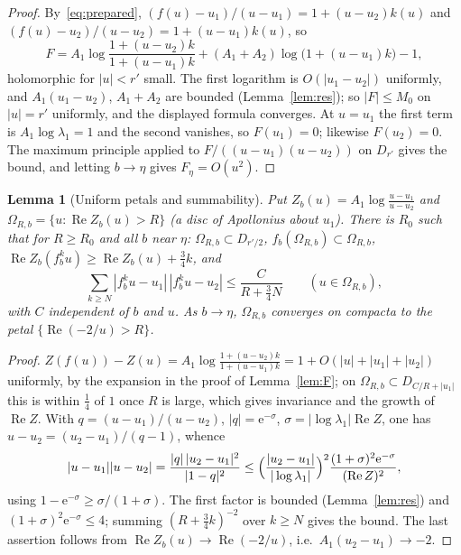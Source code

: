 \documentclass[11pt,a4paper]{article}
\newtheorem{lemma}[theorem]{Lemma}
\theoremstyle{definition}
\newcommand{\eee}{\mathrm{e}}
\begin{document}
\begin{proof}
By~\eqref{eq:prepared}, $(f(u)-u_1)/(u-u_1)=1+(u-u_2)k(u)$ and
$(f(u)-u_2)/(u-u_2)=1+(u-u_1)k(u)$, so
\[
 F=A_1\log\frac{1+(u-u_2)k}{1+(u-u_1)k}+(A_1+A_2)\log\bigl(1+(u-u_1)k\bigr)-1,
\]
holomorphic for $|u|<r'$ small.  The first logarithm is $O(|u_1-u_2|)$
uniformly, and $A_1(u_1-u_2)$, $A_1+A_2$ are bounded (Lemma~\ref{lem:res}); so
$|F|\le M_0$ on $|u|=r'$ uniformly, and the displayed formula converges.  At
$u=u_1$ the first term is $A_1\log\lambda_1=1$ and the second vanishes, so
$F(u_1)=0$; likewise $F(u_2)=0$.  The maximum principle applied to
$F/((u-u_1)(u-u_2))$ on $D_{r'}$ gives the bound, and letting $b\to\eta$ gives
$F_\eta=O(u^2)$.
\end{proof}

\begin{lemma}[Uniform petals and summability]\label{lem:petal}
Put $Z_b(u)=A_1\log\frac{u-u_1}{u-u_2}$ and
$\Omega_{R,b}=\{u:\operatorname{Re}Z_b(u)>R\}$ (a disc of Apollonius about
$u_1$).  There is $R_0$ such that for $R\ge R_0$ and all $b$ near $\eta$:
$\Omega_{R,b}\subset D_{r'/2}$, $f_b(\Omega_{R,b})\subset\Omega_{R,b}$,
$\operatorname{Re}Z_b(f_b^ku)\ge\operatorname{Re}Z_b(u)+\tfrac34k$, and
\[
 \sum_{k\ge N}|f_b^ku-u_1|\,|f_b^ku-u_2|\le\frac{C}{R+\tfrac34N}
 \qquad(u\in\Omega_{R,b}),
\]
with $C$ independent of $b$ and $u$.  As $b\to\eta$, $\Omega_{R,b}$ converges on
compacta to the petal $\{\operatorname{Re}(-2/u)>R\}$.
\end{lemma}

\begin{proof}
$Z(f(u))-Z(u)=A_1\log\frac{1+(u-u_2)k}{1+(u-u_1)k}=1+O(|u|+|u_1|+|u_2|)$
uniformly, by the expansion in the proof of Lemma~\ref{lem:F}; on
$\Omega_{R,b}\subset D_{C/R+|u_1|}$ this is within $\tfrac14$ of $1$ once $R$ is large,
which gives invariance and the growth of $\operatorname{Re}Z$.  With
$q=(u-u_1)/(u-u_2)$, $|q|=\eee^{-\sigma}$, $\sigma=|\log\lambda_1|\operatorname{Re}Z$,
one has $u-u_2=(u_2-u_1)/(q-1)$, whence
\[
 |u-u_1||u-u_2|=\frac{|q|\,|u_2-u_1|^2}{|1-q|^2}
 \le\Bigl(\frac{|u_2-u_1|}{|\log\lambda_1|}\Bigr)^2
 \frac{(1+\sigma)^2\eee^{-\sigma}}{(\operatorname{Re}Z)^2},
\]
using $1-\eee^{-\sigma}\ge\sigma/(1+\sigma)$.  The first factor is bounded
(Lemma~\ref{lem:res}) and $(1+\sigma)^2\eee^{-\sigma}\le4$; summing
$(R+\tfrac34k)^{-2}$ over $k\ge N$ gives the bound.  The last assertion follows
from $\operatorname{Re}Z_b(u)\to\operatorname{Re}(-2/u)$, i.e.\
$A_1(u_2-u_1)\to-2$.
\end{proof}
\end{document}
